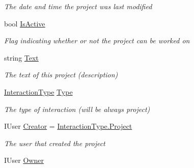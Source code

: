 \begin{DoxyCompactItemize}
\begin{DoxyCompactList}\small\item\em The date and time the project was last modified \end{DoxyCompactList}\item 
bool \hyperlink{class_plex_byte_1_1_mo_cap_1_1_interactions_1_1_project_ac9b00a5a3ce25337a513dfc9c1f6a380}{Is\+Active}
\begin{DoxyCompactList}\small\item\em Flag indicating whether or not the project can be worked on \end{DoxyCompactList}\item 
string \hyperlink{class_plex_byte_1_1_mo_cap_1_1_interactions_1_1_project_aaa6c4ef85c6ebc943137fdc24705715c}{Text}
\begin{DoxyCompactList}\small\item\em The text of this project (description) \end{DoxyCompactList}\item 
\hyperlink{namespace_plex_byte_1_1_mo_cap_1_1_interactions_a6e7bea333446664bbce2bb296db25e31}{Interaction\+Type} \hyperlink{class_plex_byte_1_1_mo_cap_1_1_interactions_1_1_project_aea479ae8fe5363b41c132933c6fb6e4a}{Type}
\begin{DoxyCompactList}\small\item\em The type of interaction (will be always project) \end{DoxyCompactList}\item 
I\+User \hyperlink{class_plex_byte_1_1_mo_cap_1_1_interactions_1_1_project_aa121bc39de6d60290903f188a3734557}{Creator} = \hyperlink{namespace_plex_byte_1_1_mo_cap_1_1_interactions_a6e7bea333446664bbce2bb296db25e31a9e727fdd3aec8274f46685441900280d}{Interaction\+Type.\+Project}
\begin{DoxyCompactList}\small\item\em The user that created the project \end{DoxyCompactList}\item 
I\+User \hyperlink{class_plex_byte_1_1_mo_cap_1_1_interactions_1_1_project_adf1484b6a6103c1c2104f6dfbba9eace}{Owner}

\end{DoxyCompactItemize}
